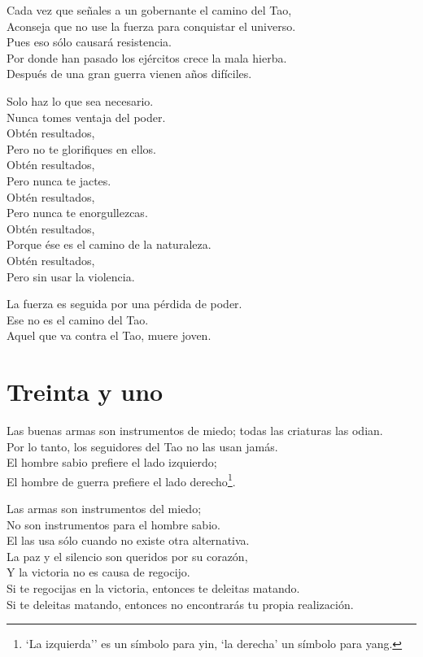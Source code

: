 \documentclass[book,b5paper,hidelinks,final]{memoir}
\begin{document}
	Cada vez que señales a un gobernante el camino del Tao,\\
	Aconseja que no use la fuerza para conquistar el universo.\\
	Pues eso sólo causará resistencia.\\
	Por donde han pasado los ejércitos crece la mala hierba.\\
	Después de una gran guerra vienen años difíciles.
	
	Solo haz lo que sea necesario.\\
	Nunca tomes ventaja del poder.\\
	Obtén resultados,\\
	Pero no te glorifiques en ellos.\\
	Obtén resultados,\\
	Pero nunca te jactes.\\
	Obtén resultados,\\
	Pero nunca te enorgullezcas.\\
	Obtén resultados,\\
	Porque ése es el camino de la naturaleza.\\
	Obtén resultados,\\
	Pero sin usar la violencia.
	
	La fuerza es seguida por una pérdida de poder.\\
	Ese no es el camino del Tao.\\
	Aquel que va contra el Tao, muere joven.
	
	\chapter*{Treinta y uno}
	
	Las buenas armas son instrumentos de miedo; todas las criaturas las
	odian.\\
	Por lo tanto, los seguidores del Tao no las usan jamás.\\
	El hombre sabio prefiere el lado izquierdo;\\
	El hombre de guerra prefiere el lado derecho\footnote{`La izquierda'' es un símbolo para yin, `la derecha' un símbolo para
		yang.}.
	
	Las armas son instrumentos del miedo;\\
	No son instrumentos para el hombre sabio.\\
	El las usa sólo cuando no existe otra alternativa.\\
	La paz y el silencio son queridos por su corazón,\\
	Y la victoria no es causa de regocijo.\\
	Si te regocijas en la victoria, entonces te deleitas matando.\\
	Si te deleitas matando, entonces no encontrarás tu propia realización.
	
\end{document}
